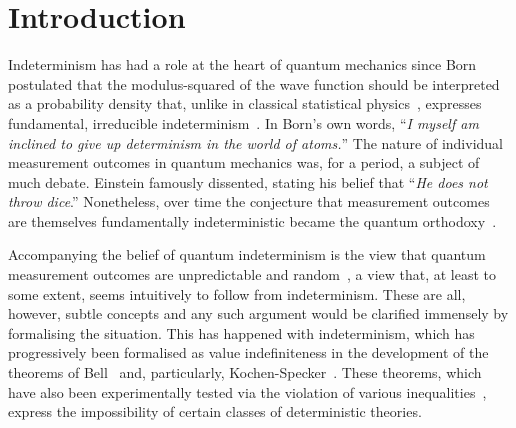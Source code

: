 \documentclass[%
 superscriptaddress,
 preprint,
 showpacs,
 showkeys,
 preprintnumbers,
  amsmath,amssymb,
  aps,
 pra,
  longbibliography,
  floatfix,
 ]{revtex4-1}
\theoremstyle{definition}
\begin{document}
\pacs{}
\keywords{}

\maketitle

\section{Introduction}

Indeterminism has had a role at the heart of quantum mechanics since Born postulated that the modulus-squared of the wave function should be interpreted as a probability density that, unlike in classical statistical physics~\cite{Myrvold2011237}, expresses fundamental,  irreducible indeterminism~\cite{born-26-1}.
In Born's own words, ``{\em I myself am inclined  to give up determinism in the world of atoms.}''
The nature of individual measurement outcomes in quantum mechanics was, for a period, a subject of much debate.
Einstein famously dissented, stating his belief that \cite[p. 204]{born-69} ``\emph{He does not throw dice}.''
Nonetheless, over time the conjecture that measurement outcomes are themselves fundamentally indeterministic became the quantum orthodoxy~\cite{zeil-05_nature_ofQuantum}.

Accompanying the belief of quantum indeterminism is the view that quantum measurement outcomes are unpredictable and random~\cite{zeil-05_nature_ofQuantum}, a view that, at least to some extent, seems intuitively to follow from indeterminism.
These are all, however, subtle concepts and any such argument would be clarified immensely by formalising the situation.
This has happened with indeterminism, which has progressively been formalised as value indefiniteness in the development of the theorems of Bell~\cite{bell-66} and, particularly,  Kochen-Specker~\cite{kochen1}.
These theorems, which have also been experimentally tested via the violation of various inequalities~\cite{wjswz-98}, express the impossibility of certain classes of deterministic theories.%
\end{document}
